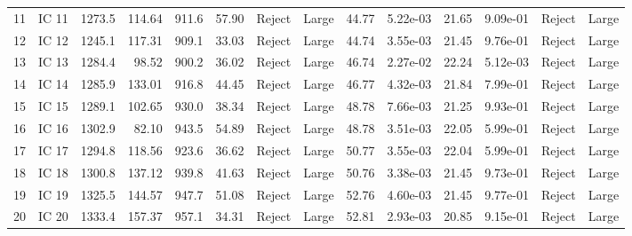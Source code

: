 \begin{tabular}{llrrrrllrrrrll}
11 &  IC 11 &             1273.5 &  114.64 &               911.6 &  57.90 &  Reject &       Large &                    44.77 &  5.22e-03 &                     21.65 &  9.09e-01 &  Reject &       Large \\
12 &  IC 12 &             1245.1 &  117.31 &               909.1 &  33.03 &  Reject &       Large &                    44.74 &  3.55e-03 &                     21.45 &  9.76e-01 &  Reject &       Large \\
13 &  IC 13 &             1284.4 &   98.52 &               900.2 &  36.02 &  Reject &       Large &                    46.74 &  2.27e-02 &                     22.24 &  5.12e-03 &  Reject &       Large \\
14 &  IC 14 &             1285.9 &  133.01 &               916.8 &  44.45 &  Reject &       Large &                    46.77 &  4.32e-03 &                     21.84 &  7.99e-01 &  Reject &       Large \\
15 &  IC 15 &             1289.1 &  102.65 &               930.0 &  38.34 &  Reject &       Large &                    48.78 &  7.66e-03 &                     21.25 &  9.93e-01 &  Reject &       Large \\
16 &  IC 16 &             1302.9 &   82.10 &               943.5 &  54.89 &  Reject &       Large &                    48.78 &  3.51e-03 &                     22.05 &  5.99e-01 &  Reject &       Large \\
17 &  IC 17 &             1294.8 &  118.56 &               923.6 &  36.62 &  Reject &       Large &                    50.77 &  3.55e-03 &                     22.04 &  5.99e-01 &  Reject &       Large \\
18 &  IC 18 &             1300.8 &  137.12 &               939.8 &  41.63 &  Reject &       Large &                    50.76 &  3.38e-03 &                     21.45 &  9.73e-01 &  Reject &       Large \\
19 &  IC 19 &             1325.5 &  144.57 &               947.7 &  51.08 &  Reject &       Large &                    52.76 &  4.60e-03 &                     21.45 &  9.77e-01 &  Reject &       Large \\
20 &  IC 20 &             1333.4 &  157.37 &               957.1 &  34.31 &  Reject &       Large &                    52.81 &  2.93e-03 &                     20.85 &  9.15e-01 &  Reject &       Large \\
\bottomrule
\end{tabular}
